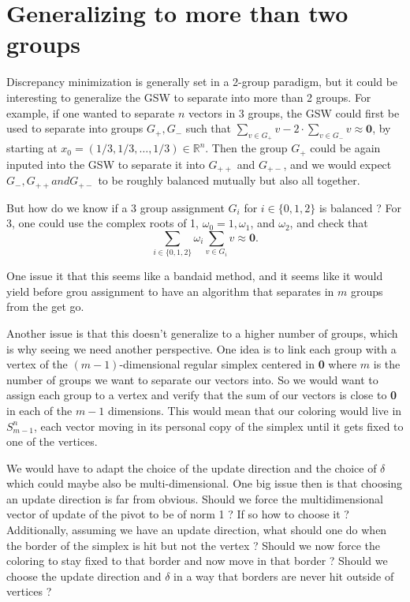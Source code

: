 \documentclass[12pt]{article}
\begin{document}
\section{Generalizing to more than two groups}
Discrepancy minimization is generally set in a 2-group paradigm, but it could be interesting to generalize the GSW to separate into more than 2 groups. For example, if one wanted to separate $n$ vectors in 3 groups, the GSW could first be used to separate into groups $G_+,G_-$ such that $\sum_{v\in G_+}v-2\cdot\sum_{v\in G_-}v\approx \textbf{0}$, by starting at $x_0=(1/3,1/3,\dots,1/3)\in\mathbb{R}^n$. Then the group $G_+$ could be again inputed into the GSW to separate it into $G_{++}$ and $G_{+-}$, and we would expect $G_-,G_{++} and G_{+-}$ to be roughly balanced mutually but also all together.

But how do we know if a 3 group assignment $G_i$ for $i\in\{0,1,2\}$ is balanced ? For 3, one could use the complex roots of 1, $\omega_0=1 ,\omega_1$, and $\omega_2$, and check that $$\sum_{i\in\{0,1,2\}}\omega_i\sum_{v\in G_i}v\approx\textbf{0}.$$

One issue it that this seems like a bandaid method, and it seems like it would yield before grou assignment to have an algorithm that separates in $m$ groups from the get go.

Another issue is that this doesn't generalize to a higher number of groups, which is why seeing we need another perspective. One  idea is to link each group with a vertex of the $(m-1)$-dimensional regular simplex centered in \textbf{0} where $m$ is the number of groups we want to separate our vectors into. So we would want to assign each group to a vertex and verify that the sum of our vectors is close to \textbf{0} in each of the $m-1$ dimensions. This would mean that our coloring would live in $S_{m-1}^n$, each vector moving in its personal copy of the simplex until it gets fixed to one of the vertices.

We would have to adapt the choice of the update direction and the choice of $\delta$ which could maybe also be multi-dimensional. One big issue then is that choosing an update direction is far from obvious. Should we force the multidimensional vector of update of the pivot to be of norm 1 ? If so how to choose it ? Additionally, assuming we have an update direction, what should one do when the border of the simplex is hit but not the vertex ? Should we now force the coloring to stay fixed to that border and now move in that border ? Should we choose the update direction and $\delta$ in a way that borders are never hit outside of vertices ?
\end{document}
